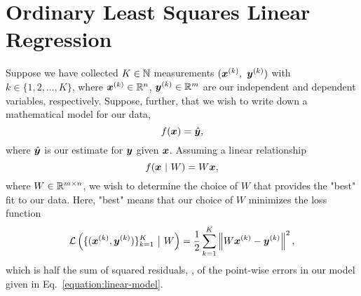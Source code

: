 \section{Ordinary Least Squares Linear Regression}
\label{section:ordinary-least-squares}
%
%
Suppose we have collected $K \in \mathbb{N}$ measurements $(\bm{x}^{(k)},~\bm{y}^{(k)})$ with $k \in \{1, 2, \dots, K\}$,
where $\bm{x}^{(k)} \in \mathbb{R}^n$, $\bm{y}^{(k)} \in \mathbb{R}^m$ are our independent and dependent variables, respectively.
Suppose, further, that we wish to write down a mathematical model for our data,
%
\begin{equation}
    f(\bm{x}) = \hat{\bm{y}},
\end{equation}
%
where $\hat{\bm{y}}$ is our estimate for $\bm{y}$ given $\bm{x}$.
Assuming a linear relationship
%
\begin{equation}
    \label{equation:linear-model}
    f(\bm{x}~|~W) = W \bm{x},
\end{equation}
%
where $W \in \mathbb{R}^{m \times n}$, we wish to determine the choice of $W$ that provides the "best" fit to our data.
Here, "best" means that our choice of $W$ minimizes the loss function
%
\begin{equation}
    \mathcal{L}\left(\{(\bm{x}^{(k)}, \bm{y}^{(k)})\}_{k=1}^K ~\big{|}~ W\right) = \frac{1}{2} \sum_{k=1}^K \left\| W \bm{x}^{(k)} - \bm{y}^{(k)} \right\|^2,
\end{equation}
%
which is half the sum of squared residuals, \ie, of the point-wise errors in our model given in Eq.~\eqref{equation:linear-model}.

